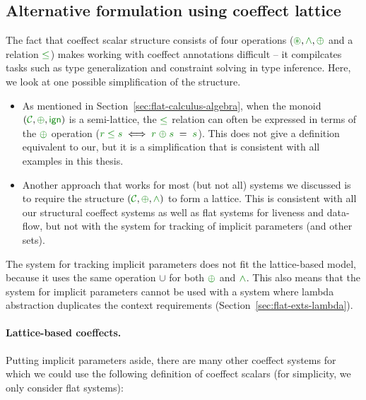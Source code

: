 
\subsection{Alternative formulation using coeffect lattice}
\label{sec:unified-impl-semilattice}

The fact that coeffect scalar structure consists of four operations ($\cseq,\czip,\cpar$ 
and a relation $\cleq$) makes working with coeffect annotations difficult -- it compilcates tasks
such as type generalization and constraint solving in type inference. Here, we look at one possible 
simplification of the structure.

\begin{itemize}
\item As mentioned in Section~\ref{sec:flat-calculus-algebra}, when the monoid $(\C,\cpar,\czero)$ is a
semi-lattice, the $\cleq$ relation can often be expressed in terms of the $\cpar$ operation 
($\cclrd{r} \;\cleq\; \cclrd{s} \;\Longleftrightarrow\; \cclrd{r} \;\cpar\; \cclrd{s} \;=\; \cclrd{s}$).
This does not give a definition equivalent to our, but it is a simplification that is consistent 
with all examples in this thesis.

\item Another approach that works for most (but not all) systems we discussed is to require the structure
$(\C,\cpar,\czip)$ to form a lattice. This is consistent with all our structural coeffect systems as
well as flat systems for liveness and data-flow, but not with the system for tracking of implicit
parameters (and other sets).
\end{itemize}

\noindent
The system for tracking implicit parameters does not fit the lattice-based model, because it uses the 
same operation $\cup$ for both $\cpar$ and $\czip$. This also means that the system for implicit parameters 
cannot be used with a system where lambda abstraction duplicates the context requirements 
(Section~\ref{sec:flat-exts-lambda}). 

\paragraph{Lattice-based coeffects.} Putting implicit parameters aside, there are many other coeffect
systems for which we could use the following definition of coeffect scalars (for simplicity, we only 
consider flat systems):

